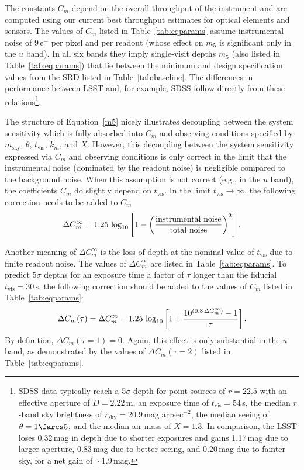 The constants $C_m$ depend on the overall throughput of the instrument
and are computed using our current best throughput estimates for
optical elements and sensors. The values of $C_m$ listed in Table~\ref{tab:eqparams}
assume instrumental noise of 9\,e$^-$ per pixel and per readout (whose effect on $m_5$
is significant only in the $u$ band). In all six bands they imply single-visit depths $m_5$
(also listed in Table~\ref{tab:eqparams}) that lie between the minimum and design
specification values from the SRD
listed in Table~\ref{tab:baseline}.
The differences in performance between LSST and, for example, SDSS
follow directly from these relations\footnote{SDSS data
typically reach a 5$\sigma$ depth for point sources of $r=22.5$
with an effective aperture of $D=2.22$\,m, an exposure time of $t_\mathrm{vis}=54$\,s,
the median $r$-band sky brightness of $r_\mathrm{sky}=20.9$\,mag arcsec$^{-2}$,
the median seeing of $\theta=1\farcs5$, and the median air mass of $X=1.3$.
In comparison, the LSST loses 0.32\,mag in depth due to shorter exposures
and gains 1.17\,mag due to larger aperture, 0.83\,mag due to better
seeing, and 0.20\,mag due to fainter sky, for a net gain of $\sim$1.9\,mag.}.

The structure of Equation~\ref{m5} nicely illustrates decoupling between the system
sensitivity which is fully absorbed into $C_m$ and observing conditions
specified by $m_\mathrm{sky}$, $\theta$, $t_\mathrm{vis}$, $k_m$,
and $X$. However, this decoupling between the system sensitivity
expressed via $C_m$ and observing conditions is only correct in the limit that the instrumental noise
(dominated by the readout noise) is negligible compared to the background noise. When this assumption
is not correct (e.g., in the $u$ band), the coefficients $C_m$ do slightly depend on $t_\mathrm{vis}$. In the limit
$t_\mathrm{vis} \rightarrow \infty$, the following correction needs to be added to $C_m$
\begin{equation}
\Delta C^\infty_m = 1.25 \,\log_{10}\left[1 - \left(\mathrm{instrumental \,\, noise} \over \mathrm{total \,\, noise}    \right)^2\right].
\end{equation}

Another meaning of $\Delta C^\infty_m$ is the loss of depth at the nominal value of $t_\mathrm{vis}$ due to finite
readout noise. The values of  $\Delta C^\infty_m$ are listed in Table~\ref{tab:eqparams}. To predict
$5\sigma$ depths for an exposure time a factor of $\tau$ longer than the fiducial $t_\mathrm{vis} = 30$\,s, the
following correction should be added to the values of $C_m$ listed in Table~\ref{tab:eqparams}:
\begin{equation}
\label{eq:DCm}
 \Delta C_m(\tau) = \Delta C^\infty_m - 1.25\,\log_{10}\left[1 + {10^{(0.8 \, \Delta C^\infty_m)} - 1 \over \tau}  \right].
\end{equation}
By definition, $\Delta C_m(\tau=1)=0$. Again, this effect is only substantial in the $u$
band, as demonstrated by the values of $\Delta C_m(\tau = 2)$ listed in Table~\ref{tab:eqparams}.

